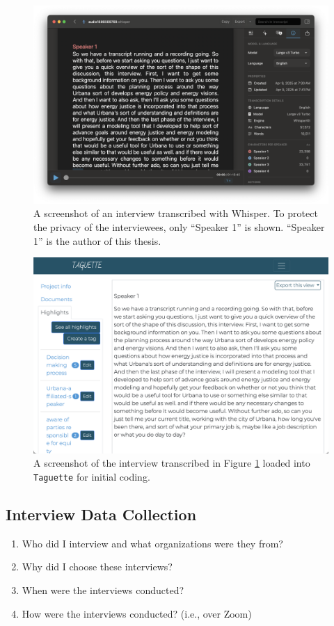 \begin{figure}
    \centering
    \includegraphics[width=0.6\columnwidth]{figures/07_interview_chapter/whisper-screenshot.png}
    \caption{A screenshot of an interview transcribed with Whisper. To protect the privacy of the interviewees, only ``Speaker 1'' is shown. 
    ``Speaker 1'' is the author of this thesis.}
    \label{fig:whisper}
\end{figure}

\begin{figure}
    \centering
    \includegraphics[width=0.6\columnwidth]{figures/07_interview_chapter/taguette-screenshot}
    \caption{A screenshot of the interview transcribed in Figure \ref{fig:whisper}
    loaded into \texttt{Taguette} for initial coding.}
    \label{fig:taguette}
\end{figure}

\subsection{Interview Data Collection}

\begin{enumerate}
    \item Who did I interview and what organizations were they from?
    \item Why did I choose these interviews?
    \item When were the interviews conducted?
    \item How were the interviews conducted? (i.e., over Zoom)
\end{enumerate}

